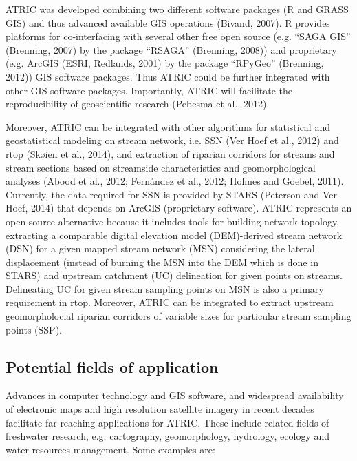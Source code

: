 ATRIC was developed combining two different software packages (R and GRASS GIS) and thus advanced available GIS operations (Bivand, 2007). R provides platforms for co-interfacing with several other free open source (e.g. “SAGA GIS” (Brenning, 2007) by the package “RSAGA” (Brenning, 2008)) and proprietary (e.g. ArcGIS (ESRI, Redlands, 2001) by the package “RPyGeo” (Brenning, 2012)) GIS software packages. Thus ATRIC could be further integrated with other GIS software  packages. Importantly, ATRIC will facilitate the reproducibility of geoscientific research (Pebesma et al., 2012).

Moreover, ATRIC can be integrated with other algorithms for statistical and geostatistical modeling on stream network, i.e. SSN (Ver Hoef et al., 2012) and rtop (Skøien et al., 2014), and extraction of riparian corridors for streams and stream sections based on streamside characteristics and geomorphological analyses (Abood et al., 2012; Fernández et al., 2012; Holmes and Goebel, 2011). Currently, the data required for SSN is provided by STARS (Peterson and Ver Hoef, 2014) that depends on ArcGIS (proprietary software). ATRIC represents an open source alternative because it includes tools for building network topology, extracting a comparable digital elevation model (DEM)-derived stream network (DSN) for a given mapped stream network (MSN) considering the lateral displacement (instead of burning the MSN into the DEM which is done in STARS) and upstream catchment (UC) delineation for given points on streams. Delineating UC for given stream sampling points on MSN is also a primary requirement in rtop. Moreover, ATRIC can be integrated to extract upstream geomorpholocial riparian corridors of variable sizes for particular stream sampling points (SSP).

\vspace{-0.25cm}

\subsection{Potential fields of application}
\label{Potential fields of application}

Advances in computer technology and GIS software, and widespread availability of electronic maps and high resolution satellite imagery in recent decades facilitate far reaching applications for ATRIC. These include related fields of freshwater research, e.g. cartography, geomorphology, hydrology, ecology and water resources management. Some examples are:

